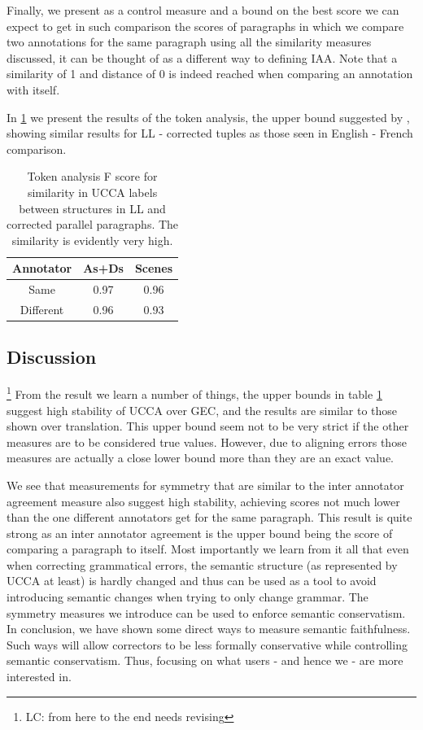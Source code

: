 \documentclass[letter,11pt]{article}
\newcommand{\lc}[1]{\footnote{\color{green}LC: #1}}
\begin{document}
	Finally, we present as a control measure and a bound on the best score
	we can expect to get in such comparison the scores of paragraphs
	in which we compare two annotations for the same paragraph using all
	the similarity measures discussed, it can be thought of as a different
	way to defining IAA. Note that a similarity
	of 1 and distance of 0 is indeed reached when comparing an annotation with itself.
	
	In \ref{tab:Token_analysis} we present the results of the token analysis, the
	upper bound suggested by \cite{sulem2015conceptual}, showing similar
	results for LL - corrected tuples as those seen in English
	- French comparison.
\vspace*{-\baselineskip}
		\begin{table}[h!]
			\centering
			\begin{tabular}{c|c|c}
				Annotator& As+Ds & Scenes\\
				\hline
				Same  & 0.97 & 0.96\\
				Different & 0.96
				 & 0.93
				 \\
				\end{tabular}
				\caption{Token analysis F score for similarity in UCCA labels between structures in LL and corrected parallel paragraphs. The similarity is evidently very high.\label{tab:Token_analysis}}
				\end{table}
				
	\subsection{Discussion}
		\lc{from here to the end needs revising}
	From the result we learn a number of things, the upper
	bounds in table \ref{tab:Token_analysis} suggest high stability of UCCA over GEC, and the results are similar to those shown over
	translation. This upper bound seem not to be very strict if the other
	measures are to be considered true values. 
	However, due to aligning errors those measures are actually a close lower bound more than they are an exact value.
	
	We see that measurements for symmetry that are similar to the inter
	annotator agreement measure also suggest high stability, achieving
	scores not much lower than the one different annotators get for the
	same paragraph. This result is quite strong as an inter annotator
	agreement is the upper bound being the score of comparing a paragraph to itself. 
	Most importantly we learn from it all that even when correcting grammatical errors, the semantic structure (as represented by UCCA at least) is hardly changed and thus can be used as a tool to avoid introducing semantic changes when trying to only change grammar. 
	The symmetry measures we introduce can be used to enforce semantic conservatism.
	In conclusion, we have shown some direct ways to measure
	semantic faithfulness. Such ways will allow correctors to be less formally conservative while controlling semantic conservatism. Thus, focusing on what users - and hence we - are more interested in.
\end{document}
